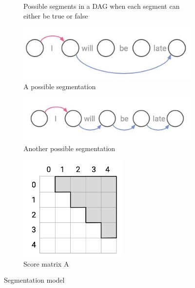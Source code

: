 \begin{figure}
\begin{subfigure}[b]{0.45\textwidth}
        \caption{Possible segments in a DAG when each segment can either be true or false}
        \label{fig:dag2}
    \end{subfigure}
    \hfill
    \begin{subfigure}[b]{0.45\textwidth}
        \centering
        \includegraphics[width=\textwidth]{figs/segmentation3.jpeg}
        \caption{A possible segmentation}
        \label{fig:segmentation}
    \end{subfigure}
    \hfill
    \begin{subfigure}[b]{0.45\textwidth}
        \centering
        \includegraphics[width=\textwidth]{figs/segmentation4.jpeg}
        \caption{Another possible segmentation}
        \label{fig:segmentation2}
    \end{subfigure}
    \hfill
    \begin{subfigure}[b]{0.45\textwidth}
        \centering
        \includegraphics[width=0.6\textwidth]{figs/matrixA.png}
        \caption{Score matrix A}
        \label{fig:matrixA}
    \end{subfigure}
    \caption{Segmentation model}
    \label{fig:segmentation_model}
\end{figure}

